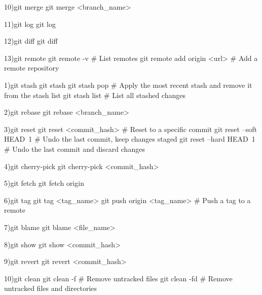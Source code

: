 10)git merge
git merge <branch_name>

11)git log
git log

12)git diff
git diff

13)git remote
git remote -v         # List remotes
git remote add origin <url>  # Add a remote repository


1)git stash
git stash
git stash pop         # Apply the most recent stash and remove it from the stash list
git stash list        # List all stashed changes

2)git rebase
git rebase <branch_name>

3)git reset
git reset <commit_hash>     # Reset to a specific commit
git reset --soft HEAD~1     # Undo the last commit, keep changes staged
git reset --hard HEAD~1     # Undo the last commit and discard changes

4)git cherry-pick
git cherry-pick <commit_hash>

5)git fetch
git fetch origin

6)git tag
git tag <tag_name>
git push origin <tag_name>   # Push a tag to a remote

7)git blame
git blame <file_name>

8)git show
git show <commit_hash>

9)git revert
git revert <commit_hash>

10)git clean
git clean -f          # Remove untracked files
git clean -fd         # Remove untracked files and directories

